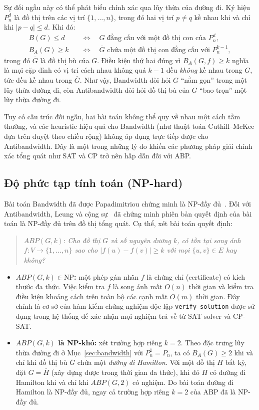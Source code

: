 \documentclass[a4paper,fleqn]{cas-sc}
\begin{document}
Sự đối ngẫu này có thể phát biểu chính xác qua lũy thừa của đường đi. Ký hiệu $P_n^{d}$ là đồ thị trên các vị trí $\{1, \dots, n\}$, trong đó hai vị trí $p \ne q$ kề nhau khi và chỉ khi $|p - q| \le d$. Khi đó:
\begin{align}
B(G) \le d \quad &\iff \quad G \text{ đẳng cấu với một đồ thị con của } P_n^{d}, \\
B_A(G) \ge k \quad &\iff \quad \overline{G} \text{ chứa một đồ thị con đẳng cấu với } P_n^{k-1},
\end{align}
trong đó $\overline{G}$ là đồ thị bù của $G$. Điều kiện thứ hai đúng vì $B_A(G, f) \ge k$ nghĩa là mọi cặp đỉnh có vị trí cách nhau không quá $k - 1$ đều \emph{không} kề nhau trong $G$, tức đều kề nhau trong $\overline{G}$. Như vậy, Bandwidth đòi hỏi $G$ ``nằm gọn'' trong một lũy thừa đường đi, còn Antibandwidth đòi hỏi đồ thị bù của $G$ ``bao trọn'' một lũy thừa đường đi.

Tuy có cấu trúc đối ngẫu, hai bài toán không thể quy về nhau một cách tầm thường, và các heuristic hiệu quả cho Bandwidth (như thuật toán Cuthill--McKee dựa trên duyệt theo chiều rộng) không áp dụng trực tiếp được cho Antibandwidth. Đây là một trong những lý do khiến các phương pháp giải chính xác tổng quát như SAT và CP trở nên hấp dẫn đối với ABP.

\subsection{Độ phức tạp tính toán (NP-hard)}
\label{sec:complexity}
Bài toán Bandwidth đã được Papadimitriou chứng minh là NP-đầy đủ~\cite{papadimitriou1976}. Đối với Antibandwidth, Leung và cộng sự~\cite{leung1984} đã chứng minh phiên bản quyết định của bài toán là NP-đầy đủ trên đồ thị tổng quát. Cụ thể, xét bài toán quyết định:

\begin{quote}
$ABP(G, k)$: \emph{Cho đồ thị $G$ và số nguyên dương $k$, có tồn tại song ánh $f : V \to \{1, \dots, n\}$ sao cho $|f(u) - f(v)| \ge k$ với mọi $\{u, v\} \in E$ hay không?}
\end{quote}

\begin{itemize}
  \item \textbf{$ABP(G, k) \in \mathrm{NP}$:} một phép gán nhãn $f$ là chứng chỉ (certificate) có kích thước đa thức. Việc kiểm tra $f$ là song ánh mất $O(n)$ thời gian và kiểm tra điều kiện khoảng cách trên toàn bộ các cạnh mất $O(m)$ thời gian. Đây chính là cơ sở của hàm kiểm chứng nghiệm độc lập \texttt{verify\_solution} được sử dụng trong hệ thống để xác nhận mọi nghiệm trả về từ SAT solver và CP-SAT.
  \item \textbf{$ABP(G, k)$ là NP-khó:} xét trường hợp riêng $k = 2$. Theo đặc trưng lũy thừa đường đi ở Mục~\ref{sec:bandwidth} với $P_n^{1} = P_n$, ta có $B_A(G) \ge 2$ khi và chỉ khi đồ thị bù $\overline{G}$ chứa một \emph{đường đi Hamilton}. Với một đồ thị $H$ bất kỳ, đặt $G = \overline{H}$ (xây dựng được trong thời gian đa thức), khi đó $H$ có đường đi Hamilton khi và chỉ khi $ABP(G, 2)$ có nghiệm. Do bài toán đường đi Hamilton là NP-đầy đủ, ngay cả trường hợp riêng $k = 2$ của ABP đã là NP-đầy đủ.
\end{itemize}
\end{document}
